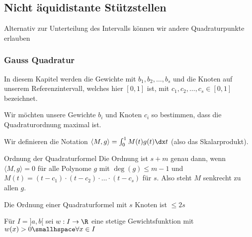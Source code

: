 \newsection
\subsection{Nicht äquidistante Stützstellen}
Alternativ zur Unterteilung des Intervalls können wir andere Quadraturpunkte erlauben

\subsubsection{Gauss Quadratur}
In diesem Kapitel werden die Gewichte mit $b_1, b_2, \ldots, b_s$ und die Knoten auf unserem Referenzintervall,
welches hier $[0, 1]$ ist, mit $c_1, c_2, \ldots, c_s \in [0, 1]$ bezeichnet.

Wir möchten unsere Gewichte $b_i$ und Knoten $c_i$ so bestimmen, dass die Quadraturordnung maximal ist.

Wir definieren die Notation $\langle M, g \rangle = \int_{0}^{1} M(t) g(t) \dx t$ (also das Skalarprodukt).

\begin{theorem}[]{Ordnung der Quadraturformel}
    Die Ordnung ist $s + m$ genau dann, wenn $\langle M, g \rangle = 0$ für alle Polynome $g$ mit $\deg(g) \leq m - 1$ und 
    $M(t) = (t - c_1) \cdot (t - c_2) \cdot \ldots \cdot (t - c_s)$ für $s$. Also steht $M$ senkrecht zu allen $g$.
\end{theorem}

 Die Ordnung einer Quadraturformel mit $s$ Knoten ist $\leq 2s$



Für $I = ]a, b[$ sei $w: I \rightarrow \R$ eine stetige Gewichtsfunktion mit $w(x) > 0 \smallhspace \forall x \in I$
